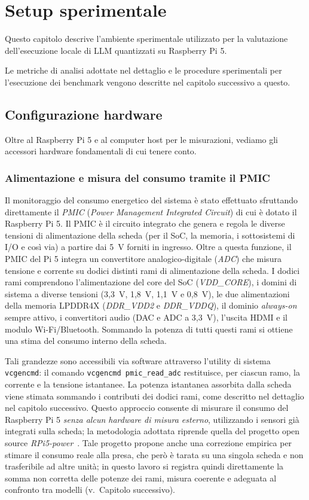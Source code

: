 \chapter{Setup sperimentale}

Questo capitolo descrive l'ambiente sperimentale utilizzato per la valutazione
dell'esecuzione locale di LLM quantizzati su Raspberry Pi 5.

Le metriche di analisi adottate nel dettaglio e le procedure sperimentali per
l'esecuzione dei benchmark vengono descritte nel capitolo successivo a questo.

\section{Configurazione hardware}

Oltre al Raspberry Pi 5 e al computer host per le misurazioni, vediamo gli accessori
hardware fondamentali di cui tenere conto.

\subsection{Alimentazione e misura del consumo tramite il PMIC}
\label{sec:pmic}
Il monitoraggio del consumo energetico del sistema è stato effettuato sfruttando
direttamente il \textit{PMIC} (\textit{Power Management Integrated Circuit}) di
cui è dotato il Raspberry Pi 5. Il PMIC è il circuito integrato che genera e
regola le diverse tensioni di alimentazione della scheda (per il SoC, la memoria,
i sottosistemi di I/O e così via) a partire dai 5~V forniti in ingresso. Oltre a
questa funzione, il PMIC del Pi 5 integra un convertitore analogico-digitale
(\textit{ADC}) che misura tensione e corrente su dodici distinti rami di
alimentazione della scheda. I dodici rami comprendono l'alimentazione del core del
SoC (\textit{VDD\_CORE}), i domini di sistema a diverse tensioni (3,3~V, 1,8~V,
1,1~V e 0,8~V), le due alimentazioni della memoria LPDDR4X (\textit{DDR\_VDD2} e
\textit{DDR\_VDDQ}), il dominio \textit{always-on} sempre attivo, i convertitori
audio (DAC e ADC a 3,3~V), l'uscita HDMI e il modulo Wi-Fi/Bluetooth. Sommando la
potenza di tutti questi rami si ottiene una stima del consumo interno della scheda.

Tali grandezze sono accessibili via software attraverso l'utility di sistema
\texttt{vcgencmd}: il comando \texttt{vcgencmd pmic\_read\_adc} restituisce, per
ciascun ramo, la corrente e la tensione istantanee. La potenza istantanea
assorbita dalla scheda viene stimata sommando i contributi dei dodici rami, come
descritto nel dettaglio nel capitolo successivo. Questo approccio consente di
misurare il consumo del Raspberry Pi 5 \emph{senza alcun hardware di misura
esterno}, utilizzando i sensori già integrati sulla scheda; la metodologia
adottata riprende quella del progetto open source
\textit{RPi5-power}~\cite{jfikar_rpi5power}. Tale progetto propone anche una
correzione empirica per stimare il consumo reale alla presa, che però è tarata su
una singola scheda e non trasferibile ad altre unità; in questo lavoro si registra
quindi direttamente la somma non corretta delle potenze dei rami, misura coerente
e adeguata al confronto tra modelli (v.\ Capitolo successivo).

